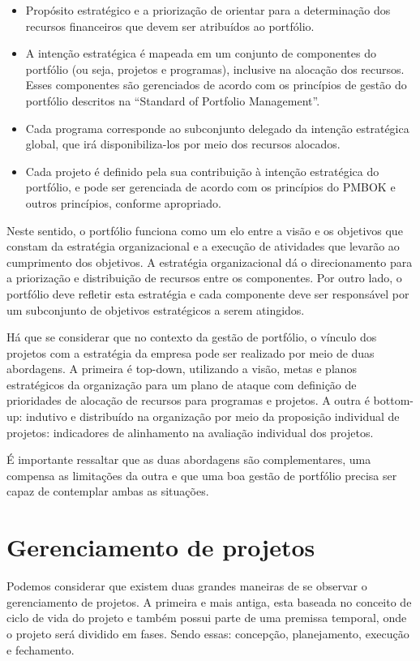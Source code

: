 \documentclass[12pt,a4paper,ruledheader,tocpage=prefix,floatnumber=continuous,pagestart=folhaderosto,font=times]{abnt}
\begin{document}
\begin{itemize}
 \item Propósito estratégico e a priorização de orientar para a determinação dos recursos financeiros que devem 
ser atribuídos ao portfólio.
  \item A intenção estratégica é mapeada em um conjunto de componentes do portfólio (ou seja, projetos e programas), inclusive na alocação 
dos recursos. Esses componentes são gerenciados de acordo com os princípios de gestão do portfólio descritos na ``Standard of Portfolio Management''.
  \item Cada programa corresponde ao subconjunto delegado da intenção estratégica global, que irá disponibiliza-los por meio dos recursos alocados.
  \item Cada projeto é definido pela sua contribuição à intenção estratégica do portfólio, e
pode ser gerenciada de acordo com os princípios do PMBOK e outros princípios, conforme apropriado.
\end{itemize}

Neste sentido, o portfólio funciona como um elo entre a visão e os objetivos que constam da estratégia organizacional e a execução de atividades que 
levarão ao cumprimento dos objetivos. A estratégia organizacional dá o direcionamento para a priorização e distribuição de recursos entre os componentes. 
Por outro lado, o portfólio deve refletir esta estratégia e cada componente deve ser responsável por um subconjunto de objetivos estratégicos a serem 
atingidos.\cite{ricardo}

Há que se considerar que no contexto da gestão de portfólio, o vínculo dos projetos com a estratégia da empresa pode ser realizado por meio de duas 
abordagens. A primeira é top-down, utilizando a visão, metas e planos estratégicos da organização para um plano de ataque com definição de prioridades 
de alocação de recursos para programas e projetos. A outra é bottom-up: indutivo e distribuído na organização por meio da proposição individual de 
projetos: indicadores de alinhamento na avaliação individual dos projetos. 

É importante ressaltar que as duas abordagens são complementares, uma compensa as limitações da outra e que uma boa gestão de portfólio precisa ser 
capaz de contemplar ambas as situações.\cite{artigo}

\section{Gerenciamento de projetos}
Podemos considerar que existem duas grandes maneiras de se observar o gerenciamento de projetos. A primeira e mais antiga, esta baseada no conceito de 
ciclo de vida do projeto e também possui parte de uma premissa temporal, onde o projeto será dividido em fases. Sendo essas: concepção, planejamento,
execução e fechamento.
\end{document}
